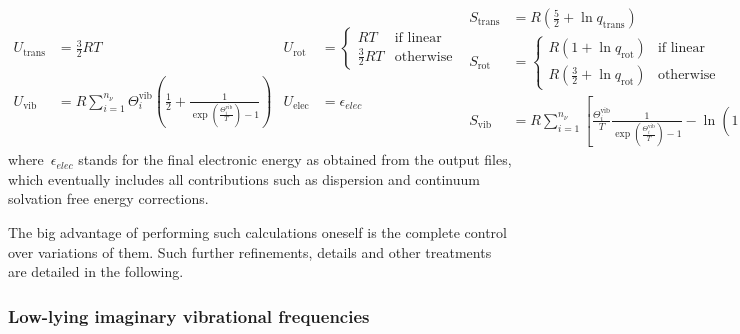 \begin{subequations}
	\begin{align}
		U_\text{trans}
		 & = \frac{3}{2} R T
		 & U_\text{rot}
		 & = \begin{cases}
			     R T             & \text{if linear} \\
			     \frac{3}{2} R T & \text{otherwise}
		     \end{cases} \\
		U_\text{vib}
		 & = R \sum_{i = 1}^{n_\nu}
		\Theta^\text{vib}_i
		\left(
		\frac{1}{2}
		+ \frac{1}{
			\exp \left( \frac{\Theta^\text{vib}_i}{T}\right)
			- 1
		}
		\right)
		 & U_\text{elec}
		 & = \epsilon_{elec}
	\end{align}
	\begin{align}
		S_\text{trans}
		 & = R \left(
		\frac{5}{2}
		+ \ln{q_\text{trans}}
		\right)
		 & S_\text{elec}
		 & = R \ln{q_\text{elec}}                           \\
		S_\text{rot}
		 & = \begin{cases}
			     R \left(
			     1
			     + \ln{q_\text{rot}}
			     \right) & \text{if linear} \\
			     R \left(
			     \frac{3}{2}
			     + \ln{q_\text{rot}}
			     \right) & \text{otherwise}
		     \end{cases} \\
		S_\text{vib}
		 & = R \sum_{i = 1}^{n_\nu}
		\left[
			\frac{
				\Theta^\text{vib}_i
			}{T}
			\frac{1}{
				\exp \left( \frac{\Theta^\text{vib}_i}{T}\right)
				- 1
			}
			- \ln{\left(
				1
				- \exp \left( - \frac{\Theta^\text{vib}_i}{T}\right)
				\right)}
			\right]
	\end{align}
\end{subequations}
%
where~$\epsilon_{elec}$ stands for the final electronic energy as obtained from the output files,
which eventually includes all contributions such as dispersion and continuum solvation free energy corrections.

The big advantage of performing such calculations oneself is the complete control over variations of them.
Such further refinements,
details and other treatments are detailed in the following.

\subsubsection{Low-lying imaginary vibrational frequencies}


